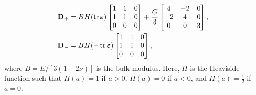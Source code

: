 \[\begin{aligned}
\mathbf{D}_+ &= BH(\operatorname{tr}\bm{\varepsilon}) \begin{bmatrix}
1 & 1 & 0 \\
1 & 1 & 0 \\
0 & 0 & 0 
\end{bmatrix} + \frac{G}3 \begin{bmatrix}
4 & -2 & 0 \\
-2 & 4 & 0 \\
0 & 0 & 3 
\end{bmatrix} ,\\
\mathbf{D}_- &= BH(-\operatorname{tr}\bm{\varepsilon}) \begin{bmatrix}
1 & 1 & 0 \\
1 & 1 & 0 \\
0 & 0 & 0 
\end{bmatrix},
\end{aligned}\]
{where $B=E/[3(1-2\nu)]$ is the bulk modulus.
	Here, $H$ is the Heaviside function such that $H(a)=1$ if $a>0$, $H(a)=0$ if $a<0$, and $H(a)=\frac12$ if $a=0$.}

